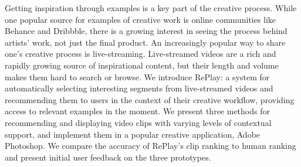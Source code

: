 Getting inspiration through examples is a key part of the creative process. While one popular source for examples of creative work is online communities like Behance and Dribbble, there is a growing interest in seeing the process behind artists' work, not just the final product. An increasingly popular way to share one's creative process is live-streaming. Live-streamed videos are a rich and rapidly growing source of inspirational content, but their length and volume makes them hard to search or browse. We introduce RePlay: a system for automatically selecting interesting segments from live-streamed videos and recommending them to users in the context of their creative workflow, providing access to relevant examples in the moment. We present three methods for recommending and displaying video clips with varying levels of contextual support, and implement them in a popular creative application, Adobe Photoshop. We compare the accuracy of RePlay's clip ranking to human ranking and present initial user feedback on the three prototypes.










